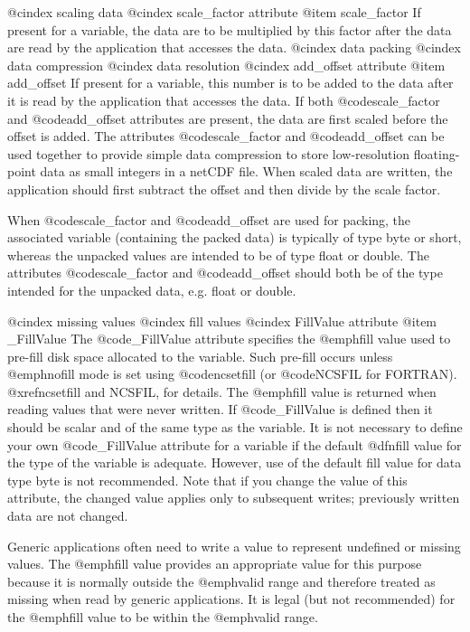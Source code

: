 @cindex scaling data
@cindex scale_factor attribute
@item scale_factor
If present for a variable, the data are to be multiplied by this factor
after the data are read by the application that accesses the data.
@cindex data packing
@cindex data compression
@cindex data resolution
@cindex add_offset attribute
@item add_offset
If present for a variable, this number is to be added to the data after
it is read by the application that accesses the data.  If
both @code{scale_factor} and @code{add_offset} attributes are present,
the data are first scaled before the offset is added.
The attributes @code{scale_factor} and @code{add_offset} can be used
together to provide simple data compression to store low-resolution
floating-point data as small integers in a netCDF file.  When scaled data
are written, the application should first subtract the offset and then
divide by the scale factor.

When @code{scale_factor} and @code{add_offset} are used for packing, the
associated variable (containing the packed data) is typically of type
byte or short, whereas the unpacked values are intended to be of type
float or double.  The attributes @code{scale_factor} and
@code{add_offset} should both be of the type intended for the unpacked
data, e.g. float or double.

@cindex missing values
@cindex fill values
@cindex FillValue attribute
@item _FillValue
The @code{_FillValue} attribute specifies the @emph{fill value} used to pre-fill
disk space allocated to the variable.
Such pre-fill occurs unless @emph{nofill mode} is set using @code{ncsetfill}
(or @code{NCSFIL} for FORTRAN).
@xref{ncsetfill and NCSFIL}, for details.
The @emph{fill value} is returned when reading values that were never written.
If @code{_FillValue} is defined then it should be scalar and of
the same type as the variable.
It is not necessary to define your own @code{_FillValue}
attribute for a variable if the default @dfn{fill value} for the type of
the variable is adequate.  
However, use of the default fill value for data type byte is not recommended.
Note that if you change the value of this
attribute, the changed value applies only to subsequent writes;
previously written data are not changed.

Generic applications often need to write a value to represent undefined or
missing values.
The @emph{fill value} provides an appropriate value for this purpose
because it is normally outside the @emph{valid range} and 
therefore treated as missing when read by generic applications.
It is legal (but not recommended) for the @emph{fill value} to be within
the @emph{valid range}.

